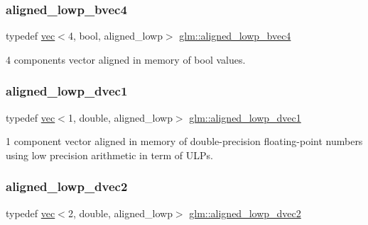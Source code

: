 \subsubsection{\texorpdfstring{aligned\+\_\+lowp\+\_\+bvec4}{aligned\_lowp\_bvec4}}
{\footnotesize\ttfamily typedef \hyperlink{structglm_1_1vec}{vec}$<$4, bool, aligned\+\_\+lowp$>$ \hyperlink{group__gtc__type__aligned_ga7584318e96ebbf1e7649a7af7724ecca}{glm\+::aligned\+\_\+lowp\+\_\+bvec4}}



4 components vector aligned in memory of bool values. 

\mbox{\label{group__gtc__type__aligned_gaa0811727b30ac5c917d48f43354f2d1f}} 
\subsubsection{\texorpdfstring{aligned\+\_\+lowp\+\_\+dvec1}{aligned\_lowp\_dvec1}}
{\footnotesize\ttfamily typedef \hyperlink{structglm_1_1vec}{vec}$<$1, double, aligned\+\_\+lowp$>$ \hyperlink{group__gtc__type__aligned_gaa0811727b30ac5c917d48f43354f2d1f}{glm\+::aligned\+\_\+lowp\+\_\+dvec1}}



1 component vector aligned in memory of double-\/precision floating-\/point numbers using low precision arithmetic in term of U\+L\+Ps. 

\mbox{\label{group__gtc__type__aligned_ga82d3a1058d43fa4547f56e8d5c7fb5ca}} 
\subsubsection{\texorpdfstring{aligned\+\_\+lowp\+\_\+dvec2}{aligned\_lowp\_dvec2}}
{\footnotesize\ttfamily typedef \hyperlink{structglm_1_1vec}{vec}$<$2, double, aligned\+\_\+lowp$>$ \hyperlink{group__gtc__type__aligned_ga82d3a1058d43fa4547f56e8d5c7fb5ca}{glm\+::aligned\+\_\+lowp\+\_\+dvec2}}



